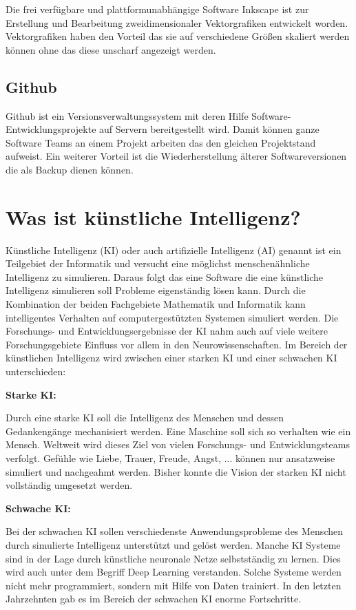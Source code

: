 \documentclass[oneside]{ausarbeitung}
\begin{document}
Die frei verfügbare und plattformunabhängige Software Inkscape ist zur Erstellung und Bearbeitung zweidimensionaler Vektorgrafiken entwickelt worden. Vektorgrafiken haben den Vorteil das sie auf verschiedene Größen skaliert werden können ohne das diese unscharf angezeigt werden. 

\subsection{Github}  

Github ist ein Versionsverwaltungssystem mit deren Hilfe Software-Entwicklungsprojekte auf Servern bereitgestellt wird. Damit können ganze Software Teams an einem Projekt arbeiten das den gleichen Projektstand aufweist. Ein weiterer Vorteil ist die Wiederherstellung älterer Softwareversionen die als Backup dienen können.

\section{Was ist künstliche Intelligenz?}

Künstliche Intelligenz (KI) oder auch artifizielle Intelligenz (AI) genannt ist ein Teilgebiet der Informatik und versucht eine möglichst menschenähnliche Intelligenz zu simulieren. Daraus folgt das eine Software die eine künstliche Intelligenz simulieren soll Probleme eigenständig lösen kann. Durch die Kombination der beiden Fachgebiete Mathematik und Informatik kann intelligentes Verhalten auf computergestützten Systemen simuliert werden. Die Forschungs- und Entwicklungsergebnisse der KI nahm auch auf viele weitere Forschungsgebiete Einfluss vor allem in den Neurowissenschaften. Im Bereich der künstlichen Intelligenz wird zwischen einer starken KI und einer schwachen KI unterschieden:

\textbf{Starke KI:}

Durch eine starke KI soll die Intelligenz des Menschen und dessen Gedankengänge mechanisiert werden. Eine Maschine soll sich so verhalten wie ein Mensch. Weltweit wird dieses Ziel von vielen Forschungs- und Entwicklungsteams verfolgt. Gefühle wie Liebe, Trauer, Freude, Angst, ... können nur ansatzweise simuliert und nachgeahmt werden. Bisher konnte die Vision der starken KI nicht vollständig umgesetzt werden.

\textbf{Schwache KI:}

Bei der schwachen KI sollen verschiedenste Anwendungsprobleme des Menschen durch simulierte Intelligenz unterstützt und gelöst werden. Manche KI Systeme sind in der Lage durch künstliche neuronale Netze selbstständig zu lernen. Dies wird auch unter dem Begriff Deep Learning verstanden. Solche Systeme werden nicht mehr programmiert, sondern mit Hilfe von Daten trainiert. In den letzten Jahrzehnten gab es im Bereich der schwachen KI enorme Fortschritte.
\end{document}
